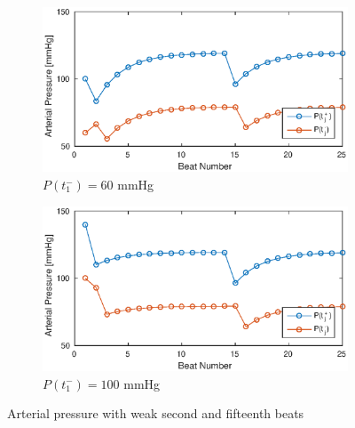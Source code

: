\documentclass{article}
\begin{document}
\begin{figure}[H]
\centering
\begin{subfigure}{0.6\textwidth}
	\includegraphics[width=\textwidth]{figures/P_B60.eps}
	\caption{$P(t_1^-) = 60$ mmHg}
\end{subfigure}

\vspace{20pt}
\begin{subfigure}{0.6\textwidth}
	\includegraphics[width=\textwidth]{figures/P_B100.eps}
	\caption{$P(t_1^-) = 100$ mmHg}
\end{subfigure}
\caption{Arterial pressure with weak second and fifteenth beats}
\end{figure}
\end{document}
